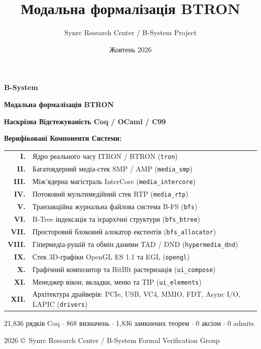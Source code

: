 \documentclass{article}
\title{Модальна формалізація BTRON}
\author{Synrc Research Center / B-System Project}
\date{Жовтень 2026}
\newcommand\HUGE{\fontsize{32}{38}\selectfont}
\begin{document}

\begin{titlepage}
  \AddToShipoutPictureBG*{\AtPageLowerLeft{\color{nato}\rule{\paperwidth}{\paperheight}}}
  \color{white}\thispagestyle{empty}\vspace*{1.8cm}\centering
  {\Huge \textbf{B-System} \par} \vspace{0.8cm}
  {\HUGE \textbf{Модальна формалізація BTRON} \par} \vspace{0.6cm}
  {\LARGE \textbf{Наскрізна Відстежуваність Coq / OCaml / C99} \par} \vspace{0.8cm}

  {\large \textbf{Верифіковані Компоненти Системи:} \par} \vspace{0.4cm}
  {\normalsize \renewcommand{\arraystretch}{1.18}
  \begin{tabular}{r@{\quad}l}
    \textbf{I.}   & Ядро реального часу ITRON / BTRON (\texttt{tron}) \\
    \textbf{II.}  & Багатоядерний медіа-стек SMP / AMP (\texttt{media\_smp}) \\
    \textbf{III.} & Між'ядерна магістраль InterCore (\texttt{media\_intercore}) \\
    \textbf{IV.}  & Потоковий мультимедійний стек RTP (\texttt{media\_rtp}) \\
    \textbf{V.}   & Транзакційна журнальна файлова система B-FS (\texttt{bfs}) \\
    \textbf{VI.}  & B-Tree індексація та ієрархічні структури (\texttt{bfs\_btree}) \\
    \textbf{VII.} & Просторовий блоковий алокатор екстентів (\texttt{bfs\_allocator}) \\
    \textbf{VIII.}& Гіпермедіа-рушій та обмін даними TAD / DND (\texttt{hypermedia\_dnd}) \\
    \textbf{IX.}  & Стек 3D-графіки OpenGL ES 1.1 та EGL (\texttt{opengl}) \\
    \textbf{X.}   & Графічний композитор та BitBlt растеризація (\texttt{ui\_compose}) \\
    \textbf{XI.}  & Менеджер вікон, вкладки, меню та TIP (\texttt{ui\_elements}) \\
    \textbf{XII.} & Архітектура драйверів: PCIe, USB, VC4, MMIO, FDT, Async I/O, LAPIC (\texttt{drivers}) \\
  \end{tabular}
  \par} \vspace{0.4cm}
  {\small 21,836 рядків Coq $\cdot$ 868 визначень $\cdot$ 1,836 замкнених теорем $\cdot$ 0 аксіом $\cdot$ 0 admits \par}
  \vfill
  {\large 2026 \copyright\ Synrc Research Center / B-System Formal Verification Group \par}
\end{titlepage}
\end{document}
